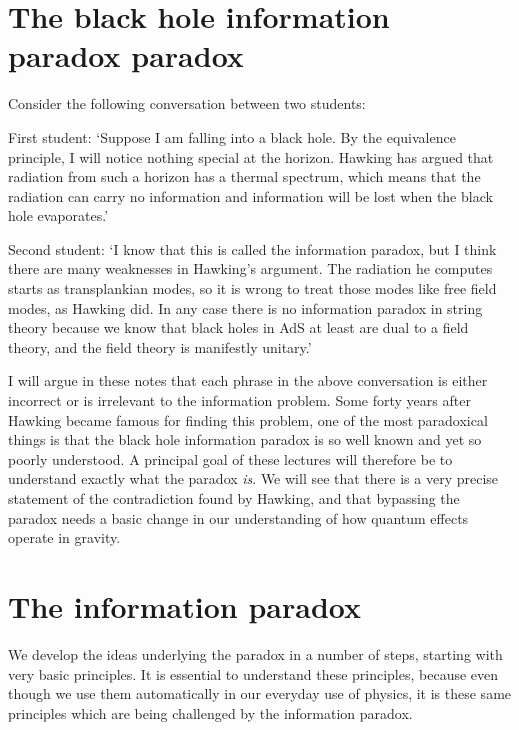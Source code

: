 \documentclass[12pt]{article}
\begin{document}
\newpage
\setcounter{page}{1}







\section{The black hole information paradox paradox}

Consider the following conversation between two students:

\bigskip

First student: \quad `Suppose I am falling into a black hole. By the equivalence principle, I will notice nothing special
at the horizon.  Hawking has argued that radiation from such a horizon has a thermal spectrum, which means that the radiation can carry no information and information will be lost when the black hole evaporates.'

\bigskip

Second student: \quad `I know that this is called the information paradox, but I think there are many weaknesses in Hawking's argument. The radiation he computes starts as transplankian modes, so it is wrong to treat those modes like free field modes, as Hawking did. In any case there is no information paradox in string theory because we know that black holes in AdS at least are dual to a field theory, and the field theory is manifestly unitary.'

\bigskip

I will argue in these notes that each phrase in the above conversation is either incorrect or is irrelevant to the information problem. Some forty years after Hawking became famous for finding this problem, one of the most paradoxical things is that the black hole information paradox is so well known and yet so poorly understood. A principal goal of these lectures will therefore be to understand exactly what the paradox {\it is}. We will see that there is a very precise statement of the contradiction found by Hawking, and that bypassing the paradox needs a basic change in our understanding of how quantum effects operate in gravity.  

\section{The information paradox}

We develop the ideas underlying the paradox in a number of steps, starting with very basic principles. It is essential to understand these principles, because even though we use them automatically in our everyday use of physics, it is these same principles which are being challenged by the information paradox.
\end{document}
